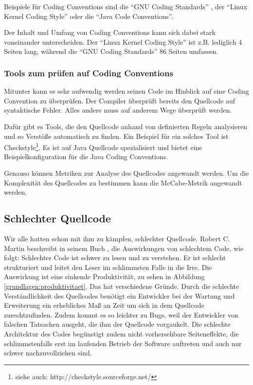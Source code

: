 Beispiele für Coding Conventions sind die \enquote{GNU Coding Standards} \cite{GNUCode},
der \enquote{Linux Kernel Coding Style}\cite{KernelCode} oder die \enquote{Java Code Conventions}\cite{javacode}.

Der Inhalt und Umfang von Coding Conventions kann sich dabei stark voneinander
unterscheiden. Der \enquote{Linux Kernel Coding Style} ist z.B. lediglich 4 Seiten lang,
während die \enquote{GNU Coding Standards} 86 Seiten umfassen.

\subsubsection{Tools zum prüfen auf Coding Conventions}


Mitunter kann es sehr aufwendig werden seinen Code im Hinblick auf eine Coding Convention zu überprüfen. Der Compiler überprüft bereits den Quellcode auf  syntaktische Fehler. Alles andere muss auf anderem Wege überprüft werden.

Dafür gibt es Tools, die den Quellcode anhand von definierten Regeln analysieren
und so Verstöße automatisch zu finden. Ein Beispiel für ein solches Tool ist Checkstyle\footnote{siehe auch: http://checkstyle.sourceforge.net/}.
Es ist auf Java Quellcode spezialisiert und bietet eine Beispielkonfiguration für
die Java Coding Conventions.

Genauso können Metriken zur Analyse des Quellcodes angewandt werden. Um die Komplexität des Quellcodes zu bestimmen kann die McCabe-Metrik\cite{McCabe} angewandt werden.

\subsection{Schlechter Quellcode}

Wir alle hatten schon mit ihm zu kämpfen, schlechter Quellcode. Robert C. Martin beschreibt in seinem Buch \cite[S. 27f.]{Martin}, die Auswirkungen von schlechtem Code, wie folgt: Schlechter Code ist schwer zu lesen und zu verstehen. Er ist schlecht strukturiert und leitet den Leser im schlimmsten Falle in die Irre.
Die Auswirkung ist eine sinkende Produktivität, zu sehen in Abbildung \ref{grundlagen:produktivitaet}.
Das hat verschiedene Gründe. Durch die schlechte Verständlichkeit des Quellcodes benötigt ein Entwickler bei der Wartung und Erweiterung ein erhebliches Maß an Zeit um sich in dem Quellcode zurechtzufinden. Zudem kommt es so leichter zu Bugs, weil der Entwickler von falschen Tatsachen ausgeht, die ihm der Quellcode vorgaukelt. Die schlechte Architektur des Codes begünstigt zudem nicht vorhersehbare Seiteneffekte, die schlimmstenfalls erst im laufenden Betrieb der Software auftreten und auch nur schwer nachzuvollziehen sind.

